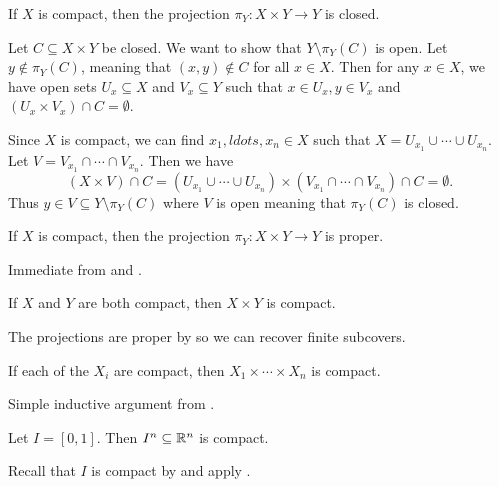 \documentclass[letterpaper, 11pt, oneside]{book}
\begin{document}
\begin{prop}\label{prop: compact_proj_closed}
  If $X$ is compact, then the projection $\pi_{Y}\colon X \times Y \to Y$ is closed.
\end{prop}
\begin{pf}
  Let $C \subseteq X \times Y$ be closed.
  We want to show that $Y \setminus \pi_{Y}(C)$ is open.
  Let $y \notin \pi_{Y}(C)$, meaning that $(x, y) \notin C$ for all $x \in X$.
  Then for any $x \in X$, we have open sets $U_{x} \subseteq X$ and $V_{x} \subseteq Y$ such that $x \in U_{x}, y \in V_{x}$ and $(U_{x} \times V_{x}) \cap C = \emptyset$.

  Since $X$ is compact, we can find $x_{1}, ldots, x_{n} \in X$ such that $X = U_{x_{1}} \cup \cdots \cup U_{x_{n}}$.
  Let $V = V_{x_{1}} \cap \cdots \cap V_{x_{n}}$.
  Then we have
  \[
    (X \times V) \cap C = ( U_{x_{1}} \cup \cdots \cup U_{x_{n}} ) \times ( V_{x_{1}} \cap \cdots \cap V_{x_{n}} ) \cap C = \emptyset.
  \]
  Thus $y \in V \subseteq Y \setminus \pi_{Y}(C)$ where $V$ is open meaning that $\pi_{Y}(C)$ is closed.
\end{pf}

\begin{cor}\label{cor: compact_projection_proper}
  If $X$ is compact, then the projection $\pi_{Y}\colon X \times Y \to Y$ is proper.
\end{cor}
\begin{pf}
  Immediate from  and .
\end{pf}

\begin{cor}\label{cor: prod_of_compact_is_compact}
  If $X$ and $Y$ are both compact, then $X \times Y$ is compact.
\end{cor}
\begin{pf}
  The projections are proper by  so we can recover finite subcovers.
\end{pf}

\begin{cor}\label{cor: tychonoff_finite}
  If each of the $X_{i}$ are compact, then $X_{1} \times \cdots \times X_{n}$ is compact.
\end{cor}
\begin{pf}
  Simple inductive argument from .
\end{pf}

\begin{cor}
  Let $I = [0, 1]$.
  Then $I^{n} \subseteq \mathbb{R}^{n}$ is compact.
\end{cor}
\begin{pf}
  Recall that $I$ is compact by  and apply .
\end{pf}
\end{document}
